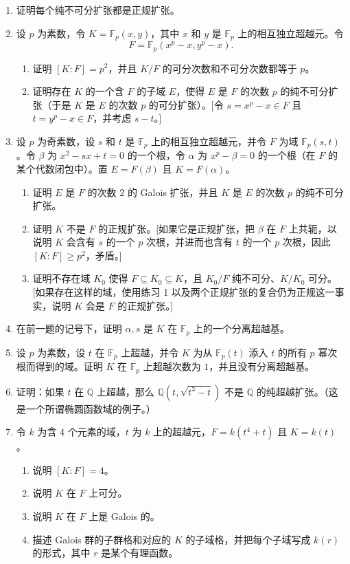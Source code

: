 \begin{enumerate}[label=\arabic*.]
\item 证明每个纯不可分扩张都是正规扩张。

\item 设 $p$ 为素数，令 $K=\mathbb F_p(x,y)$，其中 $x$ 和 $y$ 是 $\mathbb F_p$ 上的相互独立超越元。令
\[
 F=\mathbb F_p(x^p-x,y^p-x).
\]
\begin{enumerate}[label=(\alph*)]
\item 证明 $[K:F]=p^2$，并且 $K/F$ 的可分次数和不可分次数都等于 $p$。
\item 证明存在 $K$ 的一个含 $F$ 的子域 $E$，使得 $E$ 是 $F$ 的次数 $p$ 的纯不可分扩张（于是 $K$ 是 $E$ 的次数 $p$ 的可分扩张）。[令 $s=x^p-x\in F$ 且 $t=y^p-x\in F$，并考虑 $s-t$。]
\end{enumerate}

\item 设 $p$ 为奇素数，设 $s$ 和 $t$ 是 $\mathbb F_p$ 上的相互独立超越元，并令 $F$ 为域 $\mathbb F_p(s,t)$。令 $\beta$ 为 $x^2-sx+t=0$ 的一个根，令 $\alpha$ 为 $x^p-\beta=0$ 的一个根（在 $F$ 的某个代数闭包中）。置 $E=F(\beta)$ 且 $K=F(\alpha)$。
\begin{enumerate}[label=(\alph*)]
\item 证明 $E$ 是 $F$ 的次数 $2$ 的 Galois 扩张，并且 $K$ 是 $E$ 的次数 $p$ 的纯不可分扩张。
\item 证明 $K$ 不是 $F$ 的正规扩张。[如果它是正规扩张，把 $\beta$ 在 $F$ 上共轭，以说明 $K$ 会含有 $s$ 的一个 $p$ 次根，并进而也含有 $t$ 的一个 $p$ 次根，因此 $[K:F]\geq p^2$，矛盾。]
\item 证明不存在域 $K_0$ 使得 $F\subseteq K_0\subseteq K$，且 $K_0/F$ 纯不可分、$K/K_0$ 可分。[如果存在这样的域，使用练习 1 以及两个正规扩张的复合仍为正规这一事实，说明 $K$ 会是 $F$ 的正规扩张。]
\end{enumerate}

\item 在前一题的记号下，证明 $\alpha,s$ 是 $K$ 在 $\mathbb F_p$ 上的一个分离超越基。

\item 设 $p$ 为素数，设 $t$ 在 $\mathbb F_p$ 上超越，并令 $K$ 为从 $\mathbb F_p(t)$ 添入 $t$ 的所有 $p$ 幂次根而得到的域。证明 $K$ 在 $\mathbb F_p$ 上超越次数为 $1$，并且没有分离超越基。

\item 证明：如果 $t$ 在 $\mathbb Q$ 上超越，那么 $\mathbb Q(t,\sqrt{t^3-t})$ 不是 $\mathbb Q$ 的纯超越扩张。（这是一个所谓椭圆函数域的例子。）

\item 令 $k$ 为含 $4$ 个元素的域，$t$ 为 $k$ 上的超越元，$F=k(t^4+t)$ 且 $K=k(t)$。
\begin{enumerate}[label=(\alph*)]
\item 说明 $[K:F]=4$。
\item 说明 $K$ 在 $F$ 上可分。
\item 说明 $K$ 在 $F$ 上是 Galois 的。
\item 描述 Galois 群的子群格和对应的 $K$ 的子域格，并把每个子域写成 $k(r)$ 的形式，其中 $r$ 是某个有理函数。
\end{enumerate}


\end{enumerate}
